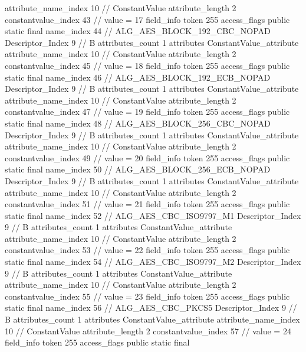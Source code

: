 {{{{{{{					attribute_name_index	10		// ConstantValue
					attribute_length	2
					constantvalue_index	43		// value = 17
				}
				}
			}
			field_info {
				token	255
				access_flags	public static final
				name_index	44		// ALG_AES_BLOCK_192_CBC_NOPAD
				Descriptor_Index	9		// B
				attributes_count	1
				attributes {
				ConstantValue_attribute {
					attribute_name_index	10		// ConstantValue
					attribute_length	2
					constantvalue_index	45		// value = 18
				}
				}
			}
			field_info {
				token	255
				access_flags	public static final
				name_index	46		// ALG_AES_BLOCK_192_ECB_NOPAD
				Descriptor_Index	9		// B
				attributes_count	1
				attributes {
				ConstantValue_attribute {
					attribute_name_index	10		// ConstantValue
					attribute_length	2
					constantvalue_index	47		// value = 19
				}
				}
			}
			field_info {
				token	255
				access_flags	public static final
				name_index	48		// ALG_AES_BLOCK_256_CBC_NOPAD
				Descriptor_Index	9		// B
				attributes_count	1
				attributes {
				ConstantValue_attribute {
					attribute_name_index	10		// ConstantValue
					attribute_length	2
					constantvalue_index	49		// value = 20
				}
				}
			}
			field_info {
				token	255
				access_flags	public static final
				name_index	50		// ALG_AES_BLOCK_256_ECB_NOPAD
				Descriptor_Index	9		// B
				attributes_count	1
				attributes {
				ConstantValue_attribute {
					attribute_name_index	10		// ConstantValue
					attribute_length	2
					constantvalue_index	51		// value = 21
				}
				}
			}
			field_info {
				token	255
				access_flags	public static final
				name_index	52		// ALG_AES_CBC_ISO9797_M1
				Descriptor_Index	9		// B
				attributes_count	1
				attributes {
				ConstantValue_attribute {
					attribute_name_index	10		// ConstantValue
					attribute_length	2
					constantvalue_index	53		// value = 22
				}
				}
			}
			field_info {
				token	255
				access_flags	public static final
				name_index	54		// ALG_AES_CBC_ISO9797_M2
				Descriptor_Index	9		// B
				attributes_count	1
				attributes {
				ConstantValue_attribute {
					attribute_name_index	10		// ConstantValue
					attribute_length	2
					constantvalue_index	55		// value = 23
				}
				}
			}
			field_info {
				token	255
				access_flags	public static final
				name_index	56		// ALG_AES_CBC_PKCS5
				Descriptor_Index	9		// B
				attributes_count	1
				attributes {
				ConstantValue_attribute {
					attribute_name_index	10		// ConstantValue
					attribute_length	2
					constantvalue_index	57		// value = 24
				}
				}
			}
			field_info {
				token	255
				access_flags	public static final
}}}}}
